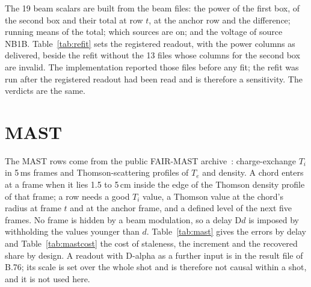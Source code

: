 \documentclass[11pt,a4paper]{article}
\newcommand{\Ti}{\ensuremath{T_i}}
\newcommand{\Te}{\ensuremath{T_e}}
\begin{document}
\begin{table}[tbp]
  \centering
  \caption{Specificity (target L5), reduction of the MSE in per cent. Mirnov: seven scalars built from the two Mirnov signals of the files exactly as the fast scalars are built, in place of them (against T0), against them (TX against that estimator) and added to them (against TX). Other discharge: the fast scalars of each row replaced by those of another discharge at the same time in the discharge, against T0. BES columns: the BES half built from one radial column of the array alone, against T0. Intervals: 95\,\%, shot clusters resampled; bold: the interval excludes zero.}
  \label{tab:specificity}
  \TabSpecificity
\end{table}

The 19 beam scalars are built from the beam files: the power of the first box, of the
second box and their total at row $t$, at the anchor row and the difference; running means
of the total; which sources are on; and the voltage of source NB1B. Table~\ref{tab:refit}
sets the registered readout, with the power columns as delivered, beside the refit without
the 13 files whose columns for the second box are invalid. The implementation reported
those files before any fit; the refit was run after the registered readout had been read
and is therefore a sensitivity. The verdicts are the same.

\begin{table}[tbp]
  \centering
  \caption{\CapRefit}
  \label{tab:refit}
  \TabRefit
\end{table}

\section{MAST}
\label{sec:smast}

The MAST rows come from the public FAIR-MAST archive~\citep{Jackson2024FairMast}:
charge-exchange \Ti{} in 5\,ms frames and Thomson-scattering profiles of \Te{} and
density. A chord enters at a frame when it lies 1.5 to 5\,cm inside the edge of the
Thomson density profile of that frame; a row needs a good \Ti{} value, a Thomson value at
the chord's radius at frame $t$ and at the anchor frame, and a defined level of the next
five frames. No frame is hidden by a beam modulation, so a delay D$d$ is imposed by
withholding the values younger than $d$. Table~\ref{tab:mast} gives the errors by delay
and Table~\ref{tab:mastcost} the cost of staleness, the increment and the recovered share
by design. A readout with D-alpha as a
further input is in the result file of B.76; its scale is set over the whole shot and is
therefore not causal within a shot, and it is not used here.
\end{document}
